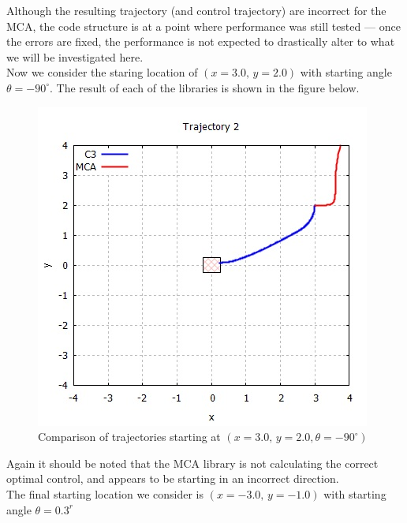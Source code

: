 \documentclass[11pt,draftd]{article}
\begin{document}
Although the resulting trajectory (and control trajectory) are incorrect for the MCA, the code structure is at a point where performance was still tested --- once the errors are fixed, the performance is not expected to drastically alter to what we will be investigated here. \\

Now we consider the staring location of $ (x = 3.0,\, y = 2.0) $ with starting angle $ \theta = -90^{\circ} $. The result of each of the libraries is shown in the figure below.

\begin{figure}[H]
	\centering
	\includegraphics[scale=0.65]{images/traj2.jpg}
	\caption{Comparison of trajectories starting at $ (x = 3.0,\, y = 2.0, \theta = -90^{\circ}) $}
\end{figure}
Again it should be noted that the MCA library is not calculating the correct optimal control, and appears to be starting in an incorrect direction. \\

The final starting location we consider is $ (x = -3.0,\, y = -1.0) $ with starting angle $ \theta = 0.3^{r} $
\end{document}
